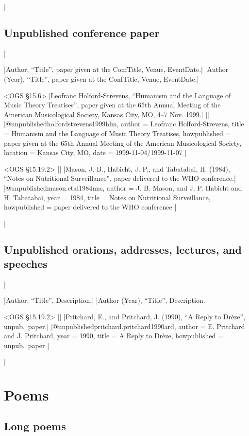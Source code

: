 \documentclass[extrafontsizes,11pt,a4paper,oneside]{memoir}
\newcommand*{\lit}[1]{\textsf{#1}}
\begin{document}
\todoc|
\section{Unpublished conference paper}
|

\specs
|Author, \enquote{Title}, \lit{paper given at the} ConfTitle, Venue, EventDate.|%
|Author (Year), \enquote{Title}, \lit{paper given at the} ConfTitle, Venue, EventDate.|

\bibexample<OGS \S15.6>
|Leofranc Holford-Strevens, \enquote{Humanism and the Language of Music Theory Treatises}, paper given at the 65th Annual Meeting of the American Musicological Society, Kansas City, MO, 4--7 Nov. 1999.|%
||%
|@unpublished{holfordstrevens1999hlm,
  author = {Leofranc Holford-Strevens},
  title = {Humanism and the Language of Music Theory Treatises},
  howpublished = {paper given at the 65th Annual Meeting of the American Musicological Society},
  location = {Kansas City, MO},
  date = {1999-11-04/1999-11-07}
}|

\bibexample<OGS \S15.19.2>
||%
|Mason, J. B., Habicht, J. P., and Tabatabai, H. (1984), \enquote{Notes on Nutritional Surveillance}, paper delivered to the WHO conference.|%
|@unpublished{mason.etal1984nns,
  author = {J. B. Mason, and J. P. Habicht and H. Tabatabai},
  year = {1984},
  title = {Notes on Nutritional Surveillance},
  howpublished = {paper delivered to the WHO conference}
}|

\todoc|
\section{Unpublished orations, addresses, lectures, and speeches}
|

\specs
|Author, \enquote{Title}, Description.|%
|Author (Year), \enquote{Title}, Description.|

\bibexample<OGS \S15.19.2>
||%
|Pritchard, E., and Pritchard, J. (1990), \enquote{A Reply to Drèze}, unpub.\ paper.|%
|@unpublished{pritchard.pritchard1990ard,
  author = {E. Pritchard and J. Pritchard},
  year = {1990},
  title = {A Reply to Drèze},
  howpublished = {unpub.\ paper}
}|

\todoc|
\chapter{Poems}\label{sec:poem}

\section{Long poems}
\end{document}
